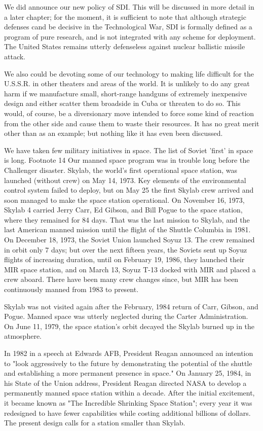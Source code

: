 We did announce our new policy of SDI. This will be discussed in more detail in a later chapter; for the moment, it is sufficient to note that although strategic defenses cand be decisive in the Technological War, SDI is formally defined as a program of pure research, and is not integrated with any scheme for deployment. The United States remains utterly defenseless against nuclear ballistic missile attack.

We also could be devoting some of our technology to making life difficult for the U.S.S.R. in other theaters and areas of the world. It is unlikely to do any great harm if we manufacture small, short-range handguns of extremely inexpensive design and either scatter them broadside in Cuba or threaten to do so. This would, of course, be a diversionary move intended to force some kind of reaction from the other side and cause them to waste their resources. It has no great merit other than as an example; but nothing like it has even been discussed.

We have taken few military initiatives in space. The list of Soviet 'first' in space is long. Footnote 14 Our manned space program was in trouble long before the Challenger disaster. Skylab, the world's first operational space station, was launched (without crew) on May 14, 1973. Key elements of the environmental control system failed to deploy, but on May 25 the first Skylab crew arrived and soon managed to make the space station operational. On November 16, 1973, Skylab 4 carried Jerry Carr, Ed Gibson, and Bill Pogue to the space station, where they remained for 84 days. That was the last mission to Skylab, and the last American manned mission until the flight of the Shuttle Columbia in 1981. On December 18, 1973, the Soviet Union launched Soyuz 13. The crew remained in orbit only 7 days; but over the next fifteen years, the Soviets sent up Soyuz flights of increasing duration, until on February 19, 1986, they launched their MIR space station, and on March 13, Soyuz T-13 docked with MIR and placed a crew aboard. There have been many crew changes since, but MIR has been continuously manned from 1983 to present.

Skylab was not visited again after the February, 1984 return of Carr, Gibson, and Pogue. Manned space was utterly neglected during the Carter Administration. On June 11, 1979, the space station's orbit decayed the Skylab burned up in the atmosphere.

In 1982 in a speech at Edwards AFB, President Reagan announced an intention to "look aggressively to the future by demonstrating the potential of the shuttle and establishing a more permanent presence in space." On January 25, 1984, in his State of the Union address, President Reagan directed NASA to develop a permanently manned space station within a decade. After the initial excitement, it became known as "The Incredible Shrinking Space Station"; every year it was redesigned to have fewer capabilities while costing additional billions of dollars. The present design calls for a station smaller than Skylab.

